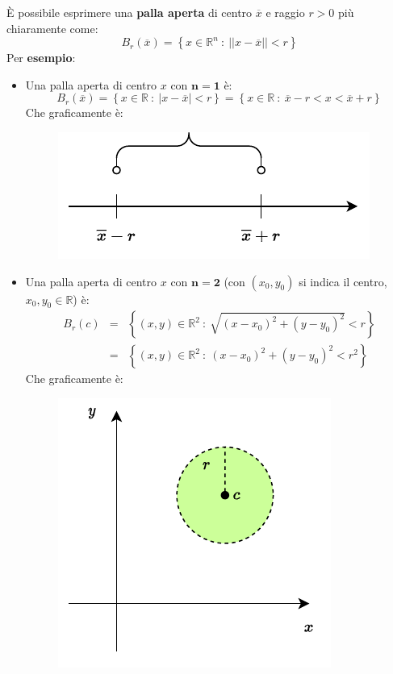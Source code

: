 \documentclass[a4paper]{article}
\newcommand{\example}[1]{\textcolor{Green4}{\textbf{#1}}}
\begin{document}
	\noindent
	È possibile esprimere una \textbf{palla aperta} di centro $\overline{x}$ e raggio $r>0$ più chiaramente come:
	\begin{equation}\label{eq: palla di centro x (informale)}
		B_{r}\left(\overline{x}\right) = \left\{x \in \mathbb{R}^{n} \: : \: || x - \overline{x} || < r\right\}
	\end{equation}
	Per \example{esempio}:
	\begin{itemize}
		\item Una palla aperta di centro $x$ con $\boldsymbol{n=1}$ è:
		\begin{equation*}
			B_{r}\left(\overline{x}\right) = \left\{x \in \mathbb{R} \: : \: |x-\overline{x}| < r\right\} = \left\{x\in\mathbb{R} \: : \: \overline{x}-r < x < \overline{x}+r\right\}
		\end{equation*}
		Che graficamente è:
		\begin{figure}[!htp]
			\centering
			\includegraphics[width=.5\textwidth]{img/palla_aperta_n=1.pdf}
		\end{figure}

		\item Una palla aperta di centro $x$ con $\boldsymbol{n=2}$ (con $\left(x_{0},y_{0}\right)$ si indica il centro, $x_{0}, y_{0} \in \mathbb{R}$) è:
		\begin{equation*}
			\begin{array}{rcl}
				B_{r}\left(c\right) &=& \left\{\left(x,y\right) \in \mathbb{R}^{2} \: : \: \sqrt{\left(x-x_{0}\right)^{2} + \left(y-y_{0}\right)^{2}} < r \right\} \\ [1em]
				&=& \left\{\left(x,y\right)\in\mathbb{R}^{2} \: : \: \left(x-x_{0}\right)^{2} + \left(y-y_{0}\right)^{2} < r^{2}\right\}
			\end{array}
		\end{equation*}
		Che graficamente è:
		\begin{figure}[!htp]
			\centering
			\includegraphics[width=.4\textwidth]{img/palla_aperta_n=2.pdf}
		\end{figure}\newpage


\end{itemize}
\end{document}
